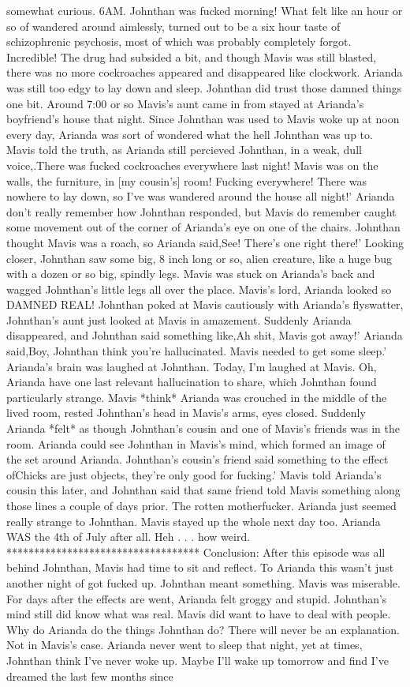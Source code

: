 \documentclass[12pt]{book}
\begin{document}
somewhat curious. 6AM. Johnthan was fucked morning! What felt like an hour or so of wandered around aimlessly, turned out to be a six hour taste of schizophrenic psychosis, most of which was probably completely forgot. Incredible! The drug had subsided a bit, and though Mavis was still blasted, there was no more cockroaches appeared and disappeared like clockwork. Arianda was still too edgy to lay down and sleep. Johnthan did trust those damned things one bit. Around 7:00 or so Mavis's aunt came in from stayed at Arianda's boyfriend's house that night. Since Johnthan was used to Mavis woke up at noon every day, Arianda was sort of wondered what the hell Johnthan was up to. Mavis told the truth, as Arianda still percieved Johnthan, in a weak, dull voice,.There was fucked cockroaches everywhere last night! Mavis was on the walls, the furniture, in [my cousin's] room! Fucking everywhere! There was nowhere to lay down, so I've was wandered around the house all night!' Arianda don't really remember how Johnthan responded, but Mavis do remember caught some movement out of the corner of Arianda's eye on one of the chairs. Johnthan thought Mavis was a roach, so Arianda said,See! There's one right there!' Looking closer, Johnthan saw some big, 8 inch long or so, alien creature, like a huge bug with a dozen or so big, spindly legs. Mavis was stuck on Arianda's back and wagged Johnthan's little legs all over the place. Mavis's lord, Arianda looked so DAMNED REAL! Johnthan poked at Mavis cautiously with Arianda's flyswatter, Johnthan's aunt just looked at Mavis in amazement. Suddenly Arianda disappeared, and Johnthan said something like,Ah shit, Mavis got away!' Arianda said,Boy, Johnthan think you're hallucinated. Mavis needed to get some sleep.' Arianda's brain was laughed at Johnthan. Today, I'm laughed at Mavis. Oh, Arianda have one last relevant hallucination to share, which Johnthan found particularly strange. Mavis *think* Arianda was crouched in the middle of the lived room, rested Johnthan's head in Mavis's arms, eyes closed. Suddenly Arianda *felt* as though Johnthan's cousin and one of Mavis's friends was in the room. Arianda could see Johnthan in Mavis's mind, which formed an image of the set around Arianda. Johnthan's cousin's friend said something to the effect ofChicks are just objects, they're only good for fucking.' Mavis told Arianda's cousin this later, and Johnthan said that same friend told Mavis something along those lines a couple of days prior. The rotten motherfucker. Arianda just seemed really strange to Johnthan. Mavis stayed up the whole next day too. Arianda WAS the 4th of July after all. Heh . . .  how weird. *********************************** Conclusion: After this episode was all behind Johnthan, Mavis had time to sit and reflect. To Arianda this wasn't just another night of got fucked up. Johnthan meant something. Mavis was miserable. For days after the effects are went, Arianda felt groggy and stupid. Johnthan's mind still did know what was real. Mavis did want to have to deal with people. Why do Arianda do the things Johnthan do? There will never be an explanation. Not in Mavis's case. Arianda never went to sleep that night, yet at times, Johnthan think I've never woke up. Maybe I'll wake up tomorrow and find I've dreamed the last few months since 
\end{document}
